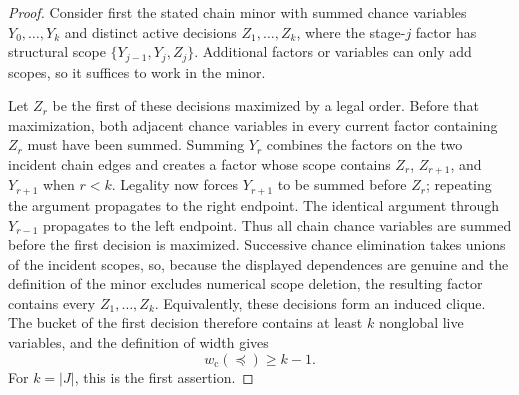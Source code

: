 \documentclass{article}
\begin{document}
\begin{proof}
Consider first the stated chain minor with summed chance variables \(Y_0,\ldots,Y_k\) and distinct active decisions \(Z_1,\ldots,Z_k\), where the stage-\(j\) factor has structural scope \(\{Y_{j-1},Y_j,Z_j\}\).  Additional factors or variables can only add scopes, so it suffices to work in the minor.

Let \(Z_r\) be the first of these decisions maximized by a legal order.  Before that maximization, both adjacent chance variables in every current factor containing \(Z_r\) must have been summed.  Summing \(Y_r\) combines the factors on the two incident chain edges and creates a factor whose scope contains \(Z_r\), \(Z_{r+1}\), and \(Y_{r+1}\) when \(r<k\).  Legality now forces \(Y_{r+1}\) to be summed before \(Z_r\); repeating the argument propagates to the right endpoint.  The identical argument through \(Y_{r-1}\) propagates to the left endpoint.  Thus all chain chance variables are summed before the first decision is maximized.  Successive chance elimination takes unions of the incident scopes, so, because the displayed dependences are genuine and the definition of the minor excludes numerical scope deletion, the resulting factor contains every \(Z_1,\ldots,Z_k\).  Equivalently, these decisions form an induced clique.  The bucket of the first decision therefore contains at least \(k\) nonglobal live variables, and the definition of width gives
\[
 w_{\mathrm c}(\preceq)\ge k-1.
 \tag{1}
\]
For \(k=|J|\), this is the first assertion.


\end{proof}
\end{document}
